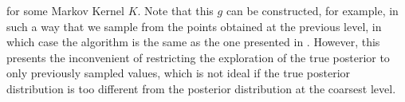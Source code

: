 for some Markov Kernel $K$. Note that this $g$ can be constructed, for example, in such a way that we sample from  the points obtained at the previous level, in which case the algorithm is the same as the one presented  in \cite{dodwell2015hierarchical}. However, this presents the inconvenient of restricting the exploration of the true posterior to only previously sampled values, which is not ideal if the true posterior distribution is too different from the posterior distribution at the coarsest level.

